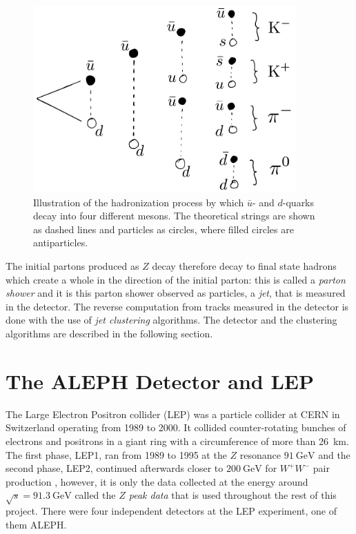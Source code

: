 \begin{figure}
  \centerfloat
  \includegraphics[width=0.9\textwidth]{figures/hadronization/hadronization.pdf}
  \caption[Hadronization process]{Illustration of the hadronization process by which $\bar{u}$- and $d$-quarks decay into four different mesons. The theoretical strings are shown as dashed lines and particles as circles, where filled circles are antiparticles.}
  \label{fig:hep:hadronization}
\end{figure}

The initial partons produced as $Z$ decay therefore decay to final state hadrons which create a whole  in the direction of the initial parton: this is called a \emph{parton shower} and it is this parton shower observed as particles, a \emph{jet}, that is measured in the detector. The reverse computation from tracks measured in the detector is done with the use of \emph{jet clustering} algorithms. The detector and the clustering algorithms are described in the following section.


\FloatBarrier
\section{The ALEPH Detector and LEP}
\label{sec:hep:aleph}

The Large Electron Positron collider (LEP) was a particle collider at CERN in Switzerland operating from \num{1989} to \num{2000}. It collided counter-rotating bunches of electrons and positrons in a giant ring with a circumference of more than \SI{26}{\km}. The first phase, LEP1, ran from \num{1989} to \num{1995} at the $Z$ resonance $\SI{91}{\GeV}$ and the second phase, LEP2, continued afterwards closer to $\SI{200}{\GeV}$ for $W^+W^-$ pair production \autocite{Armstrong1998hy}, however, it is only the data collected at the energy around $\sqrt{s} = \SI{91.3}{\GeV}$ called the \emph{$Z$ peak data} that is used throughout the rest of this project. There were four independent detectors at the LEP experiment, one of them ALEPH.

